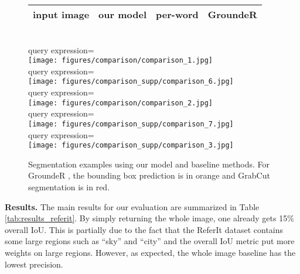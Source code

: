 \documentclass[runningheads]{llncs}
\begin{document}
\begin{figure}[t]
\centering
\begin{tabularx}{0.95\linewidth}{YYYY}
input image & our model & per-word & GroundeR \cite{rohrbach2015grounding} \\ \hline
\end{tabularx} \\
\small{query expression=} \\
\texttt{[image: figures/comparison/comparison\_1.jpg]} \\
\small{query expression=} \\
\texttt{[image: figures/comparison\_supp/comparison\_6.jpg]} \\
\small{query expression=} \\
\texttt{[image: figures/comparison/comparison\_2.jpg]} \\
\small{query expression=} \\
\texttt{[image: figures/comparison\_supp/comparison\_7.jpg]} \\
\small{query expression=} \\
\texttt{[image: figures/comparison\_supp/comparison\_3.jpg]} \\
\caption{Segmentation examples using our model and baseline methods. For GroundeR \cite{rohrbach2015grounding}, the bounding box prediction is in orange and GrabCut segmentation is in red.}
\label{fig:comparison}
\end{figure}

\textbf{Results.}
The main results for our evaluation are summarized in Table \ref{tab:results_referit}. By simply returning the whole image, one already gets 15\% overall IoU. This is partially due to the fact that the ReferIt dataset contains some large regions such as ``sky'' and ``city'' and the overall IoU metric put more weights on large regions. However, as expected, the whole image baseline has the lowest precision.
\end{document}
